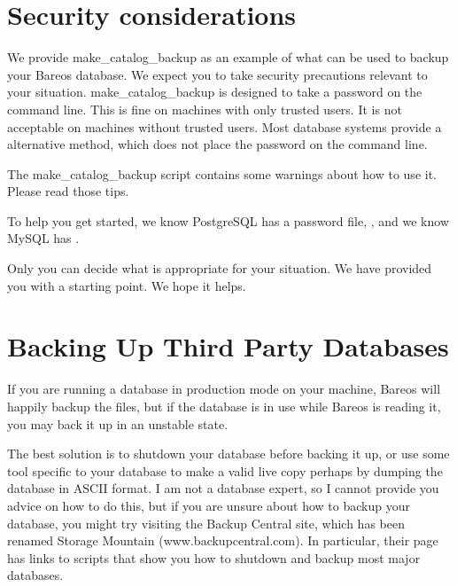 \label{BackingUpBareosSecurityConsiderations}
\section{Security considerations}

We provide make\_catalog\_backup as an example of what can be used to backup
your Bareos database.  We expect you to take security precautions relevant
to your situation.  make\_catalog\_backup is designed to take a password on
the command line.  This is fine on machines with only trusted users.  It is
not acceptable on machines without trusted users.  Most database systems
provide a alternative method, which does not place the password on the
command line.

The make\_catalog\_backup script contains some warnings about how to use it. Please
read those tips.

To help you get started, we know PostgreSQL has a password file,
, and
we know MySQL has
.

Only you can decide what is appropriate for your situation. We have provided
you with a starting point.  We hope it helps.


\label{BackingUPOtherDBs}
\section{Backing Up Third Party Databases}

If you are running a database in production mode on your machine, Bareos will
happily backup the files, but if the database is in use while Bareos is
reading it, you may back it up in an unstable state.

The best solution is to shutdown your database before backing it up, or use
some tool specific to your database to make a valid live copy perhaps by
dumping the database in ASCII format. I am not a database expert, so I cannot
provide you advice on how to do this, but if you are unsure about how to
backup your database, you might try visiting the Backup Central site, which
has been renamed Storage Mountain (www.backupcentral.com). In particular,
their
 page has
links to scripts that show you how to shutdown and backup most major
databases.
\label{Size}

